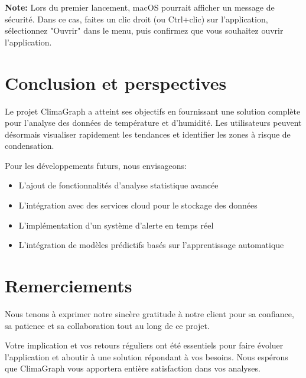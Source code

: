 \documentclass[a4paper,11pt]{article}
\begin{document}
\textbf{Note:} Lors du premier lancement, macOS pourrait afficher un message de sécurité. Dans ce cas, faites un clic droit (ou Ctrl+clic) sur l'application, sélectionnez "Ouvrir" dans le menu, puis confirmez que vous souhaitez ouvrir l'application.

\section{Conclusion et perspectives}

Le projet ClimaGraph a atteint ses objectifs en fournissant une solution complète pour l'analyse des données de température et d'humidité. Les utilisateurs peuvent désormais visualiser rapidement les tendances et identifier les zones à risque de condensation.

Pour les développements futurs, nous envisageons:
\begin{itemize}
    \item L'ajout de fonctionnalités d'analyse statistique avancée
    \item L'intégration avec des services cloud pour le stockage des données
    \item L'implémentation d'un système d'alerte en temps réel
    \item L'intégration de modèles prédictifs basés sur l'apprentissage automatique
\end{itemize}




\section*{Remerciements}

Nous tenons à exprimer notre sincère gratitude à notre client pour sa confiance, sa patience et sa collaboration tout au long de ce projet.  

Votre implication et vos retours réguliers ont été essentiels pour faire évoluer l’application et aboutir à une solution répondant à vos besoins. Nous espérons que ClimaGraph vous apportera entière satisfaction dans vos analyses.
\end{document}
